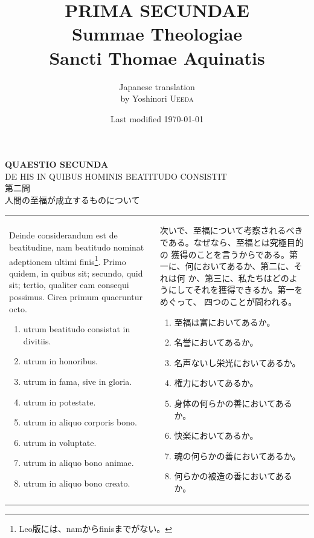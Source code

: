 \documentclass[paper=a4paper,fontsize=10pt,jafontsize=9pt,titlepage]{jlreq}
\title{{\bfseries PRIMA SECUNDAE}\\{\Huge Summae Theologiae}\\Sancti Thomae
Aquinatis}
\author{Japanese translation\\by Yoshinori {\scshape Ueeda}}
\date{Last modified \today}
\begin{document}
\maketitle
\pagestyle{fancy}


\begin{center}
 {\Large {\bfseries QUAESTIO SECUNDA}}\\
 {\large DE HIS IN QUIBUS HOMINIS BEATITUDO CONSISTIT}\\

 {\Large 第二問\\人間の至福が成立するものについて}
\end{center}

\begin{longtable}{p{21em}p{21em}}
Deinde considerandum est de beatitudine, nam beatitudo nominat
 adeptionem ultimi finis\footnote{Leo版には、namからfinisまでがない。}. Primo quidem, in quibus sit; secundo, quid
 sit; tertio, qualiter eam consequi possimus. Circa primum quaeruntur
 octo.

 \begin{enumerate}
  \item utrum beatitudo consistat in divitiis.
  \item utrum in honoribus.
  \item utrum in fama, sive in gloria.
  \item utrum in potestate.
  \item utrum in aliquo corporis bono. 
  \item utrum in voluptate.
  \item utrum in aliquo bono animae.
  \item utrum in aliquo bono creato.
 \end{enumerate}
 

 
&

 次いで、至福について考察されるべきである。なぜなら、至福とは究極目的の
 獲得のことを言うからである。第一に、何においてあるか、第二に、それは何
 か、第三に、私たちはどのようにしてそれを獲得できるか。第一をめぐって、
 四つのことが問われる。
 \begin{enumerate}
  \item 至福は富においてあるか。
  \item 名誉においてあるか。
  \item 名声ないし栄光においてあるか。
  \item 権力においてあるか。
  \item 身体の何らかの善においてあるか。
  \item 快楽においてあるか。
  \item 魂の何らかの善においてあるか。
  \item 何らかの被造の善においてあるか。
 \end{enumerate}

\end{longtable}
\end{document}
